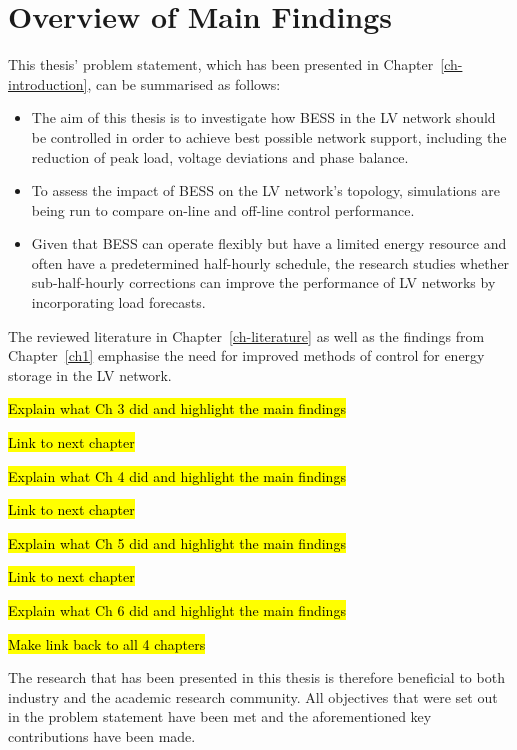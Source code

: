 \section{Overview of Main Findings}
\label{ch-conclusion:main-findings}

This thesis' problem statement, which has been presented in Chapter~\ref{ch-introduction}, can be summarised as follows:

\begin{itemize}
	\item
	The aim of this thesis is to investigate how BESS in the LV network should be controlled in order to achieve best possible network support, including the reduction of peak load, voltage deviations and phase balance.
	\item 
	To assess the impact of BESS on the LV network's topology, simulations are being run to compare on-line and off-line control performance.
	\item
	Given that BESS can operate flexibly but have a limited energy resource and often have a predetermined half-hourly schedule, the research studies whether sub-half-hourly corrections can improve the performance of LV networks by incorporating load forecasts.
\end{itemize}

The reviewed literature in Chapter~\ref{ch-literature} as well as the findings from Chapter~\ref{ch1} emphasise the need for improved methods of control for energy storage in the LV network.

\hl{Explain what Ch 3 did and highlight the main findings}

\hl{Link to next chapter}

\hl{Explain what Ch 4 did and highlight the main findings}

\hl{Link to next chapter}

\hl{Explain what Ch 5 did and highlight the main findings}

\hl{Link to next chapter}

\hl{Explain what Ch 6 did and highlight the main findings}

\hl{Make link back to all 4 chapters}


The research that has been presented in this thesis is therefore beneficial to both industry and the academic research community.
All objectives that were set out in the problem statement have been met and the aforementioned key contributions have been made.


